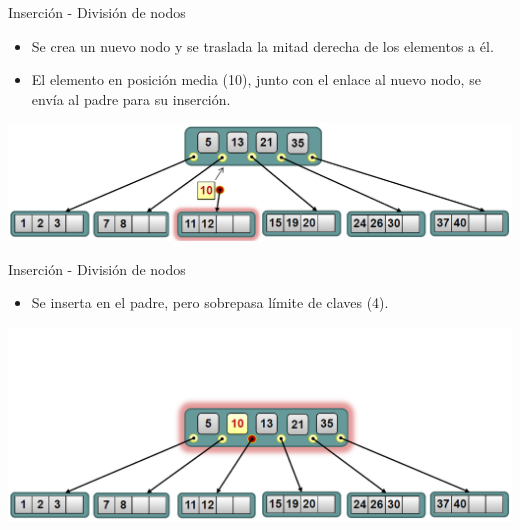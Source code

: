 \documentclass[handout]{beamer} %
\begin{document}
\begin{frame}{Inserción - División de nodos}
    \begin{itemize}
        \item Se crea un nuevo nodo y se traslada la mitad derecha de los elementos a él.
        \item El elemento en posición media (10), junto con el enlace al nuevo nodo, se envía al padre para su inserción.
    \end{itemize}
    \vspace{-.2ex}

    \begin{center}
        \includegraphics[width=\textwidth]{./image/cap3/b-tree-insert7}
    \end{center}
\end{frame}

\begin{frame}{Inserción - División de nodos}
    \begin{itemize}
        \item Se inserta en el padre, pero sobrepasa límite de claves (4).
    \end{itemize}
    \begin{center}
        \includegraphics[width=\textwidth]{./image/cap3/b-tree-insert8}
    \end{center}
\end{frame}
\end{document}
